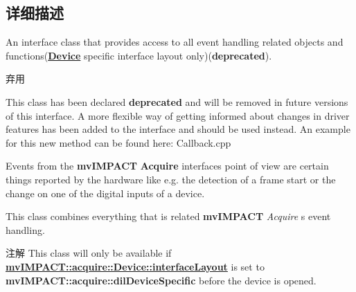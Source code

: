\subsection{详细描述}
An interface class that provides access to all event handling related objects and functions({\bfseries \hyperlink{classmv_i_m_p_a_c_t_1_1acquire_1_1_device}{Device}} specific interface layout only)({\bfseries deprecated}). 

\begin{DoxyRefDesc}{弃用}
\item[\hyperlink{deprecated__deprecated000013}{弃用}]This class has been declared {\bfseries deprecated} and will be removed in future versions of this interface. A more flexible way of getting informed about changes in driver features has been added to the interface and should be used instead. An example for this new method can be found here\+: Callback.\+cpp\end{DoxyRefDesc}


Events from the {\bfseries mv\+I\+M\+P\+A\+C\+T} {\bfseries Acquire} interfaces point of view are certain things reported by the hardware like e.\+g. the detection of a frame start or the change on one of the digital inputs of a device.

This class combines everything that is related {\bfseries mv\+I\+M\+P\+A\+C\+T} {\itshape Acquire} s event handling.

\begin{DoxyNote}{注解}
This class will only be available if {\bfseries \hyperlink{classmv_i_m_p_a_c_t_1_1acquire_1_1_device_ab4dd0ecc9d456bb5ddc01d844c9d6f2d}{mv\+I\+M\+P\+A\+C\+T\+::acquire\+::\+Device\+::interface\+Layout}} is set to {\bfseries mv\+I\+M\+P\+A\+C\+T\+::acquire\+::dil\+Device\+Specific} before the device is opened. 
\end{DoxyNote}



